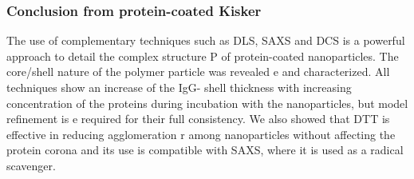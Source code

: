 \subsubsection{Conclusion from protein-coated Kisker}

The use of complementary techniques such as DLS, SAXS and DCS is a powerful approach to detail the complex structure P of protein-coated nanoparticles. The core/shell nature of the polymer particle was revealed e  and characterized. All techniques show an increase of the IgG- shell thickness with increasing concentration of the proteins during incubation with the nanoparticles, but model refinement is e required for their full consistency. We also showed that DTT is effective in reducing agglomeration r  among nanoparticles without affecting the protein corona and its use is compatible with SAXS, where it is used as a radical scavenger.


